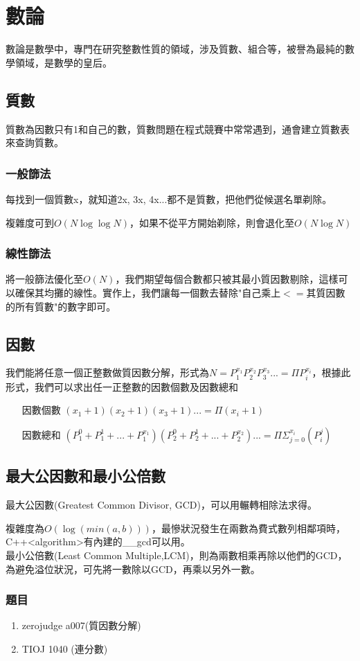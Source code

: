 \section{數論}
數論是數學中，專門在研究整數性質的領域，涉及質數、組合等，被譽為最純的數學領域，是數學的皇后。
\subsection{質數}
質數為因數只有1和自己的數，質數問題在程式競賽中常常遇到，通會建立質數表來查詢質數。
\subsubsection{一般篩法}
每找到一個質數x，就知道2x, 3x, 4x...都不是質數，把他們從候選名單剃除。

複雜度可到$O(N\log\log N)$，如果不從平方開始剃除，則會退化至$O(N\log N)$
\subsubsection{線性篩法}
將一般篩法優化至$O(N)$，我們期望每個合數都只被其最小質因數剔除，這樣可以確保其均攤的線性。實作上，我們讓每一個數去替除"自己乘上$<=$其質因數的所有質數"的數字即可。

\subsection{因數}
我們能將任意一個正整數做質因數分解，形式為$N=P_{1}^{x_{1}}P_{2}^{x_{2}}P_{3}^{x_{3}}...=\Pi P_{i}^{x_{i}}$，根據此形式，我們可以求出任一正整數的因數個數及因數總和
\begin{enumerate}
\item [因數個數] $(x_{1}+1)(x_{2}+1)(x_{3}+1)...=\Pi (x_{i}+1)$
\item [因數總和] $(P_{1}^{0}+P_{1}^{1}+...+P_{1}^{x_{1}})(P_{2}^{0}+P_{2}^{1}+...+P_{2}^{x_{2}})...=\Pi\Sigma_{j=0}^{x_{i}}(P_{i}^{j})$
\end{enumerate}
\subsection{最大公因數和最小公倍數}
最大公因數(Greatest Common Divisor, GCD)，可以用輾轉相除法求得。

複雜度為$O(\log(min(a,b)))$，最慘狀況發生在兩數為費式數列相鄰項時，C++<algorithm>有內建的\_\_gcd可以用。\\
最小公倍數(Least Common Multiple,LCM)，則為兩數相乘再除以他們的GCD，為避免溢位狀況，可先將一數除以GCD，再乘以另外一數。
\subsubsection{題目}
\begin{enumerate}
\item zerojudge a007(質因數分解)
\item TIOJ 1040 (連分數)
\end{enumerate}
